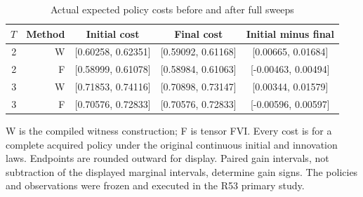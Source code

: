 \begin{table}[htbp]
\centering
\caption{Actual expected policy costs before and after full sweeps}\label{tab:primary-cost54}
{\small\setlength{\tabcolsep}{4pt}
\begin{tabular}{rrccc}
\hline
$T$ & Method & Initial cost & Final cost & Initial minus final \\
\hline
2 & W & [0.60258, 0.62351] & [0.59092, 0.61168] & [0.00665, 0.01684] \\
2 & F & [0.58999, 0.61078] & [0.58984, 0.61063] & [-0.00463, 0.00494] \\
3 & W & [0.71853, 0.74116] & [0.70898, 0.73147] & [0.00344, 0.01579] \\
3 & F & [0.70576, 0.72833] & [0.70576, 0.72833] & [-0.00596, 0.00597] \\
\hline
\end{tabular}}
\par\smallskip
{\footnotesize W is the compiled witness construction; F is tensor FVI. Every cost is for a complete acquired policy under the original continuous initial and innovation laws. Endpoints are rounded outward for display. Paired gain intervals, not subtraction of the displayed marginal intervals, determine gain signs. The policies and observations were frozen and executed in the R53 primary study.}
\end{table}

